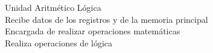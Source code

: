 \documentclass[preview]{standalone}
\begin{document}
Unidad Aritmético Lógica\\Recibe datos de los registros y de la memoria principal\\Encargada de realizar operaciones matemáticas\\Realiza operaciones de lógica\\
\end{document}
